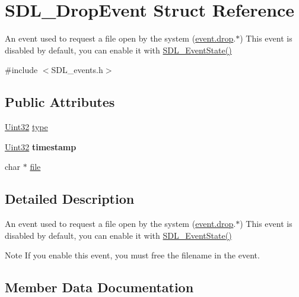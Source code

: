 \hypertarget{structSDL__DropEvent}{}\section{S\+D\+L\+\_\+\+Drop\+Event Struct Reference}
\label{structSDL__DropEvent}


An event used to request a file open by the system (\hyperlink{unionSDL__Event_acff77bccbca65abbb876360a3f5209c9}{event.\+drop}.$\ast$) This event is disabled by default, you can enable it with \hyperlink{SDL__events_8h_afb772893e1c46f186fa39a4defe76df3}{S\+D\+L\+\_\+\+Event\+State()}  




{\ttfamily \#include $<$S\+D\+L\+\_\+events.\+h$>$}

\subsection*{Public Attributes}
\begin{DoxyCompactItemize}
\item 
\hyperlink{SDL__stdinc_8h_add440eff171ea5f55cb00c4a9ab8672d}{Uint32} \hyperlink{structSDL__DropEvent_a5ea27cfaa5f8d4940e9a69b68b3cc035}{type}
\item 
\hypertarget{structSDL__DropEvent_a02d2c81bb22db632a40cd0021ff751ab}{}\hyperlink{SDL__stdinc_8h_add440eff171ea5f55cb00c4a9ab8672d}{Uint32} {\bfseries timestamp}\label{structSDL__DropEvent_a02d2c81bb22db632a40cd0021ff751ab}

\item 
char $\ast$ \hyperlink{structSDL__DropEvent_abc41ef4beb62e1d8b56827128b29585f}{file}
\end{DoxyCompactItemize}


\subsection{Detailed Description}
An event used to request a file open by the system (\hyperlink{unionSDL__Event_acff77bccbca65abbb876360a3f5209c9}{event.\+drop}.$\ast$) This event is disabled by default, you can enable it with \hyperlink{SDL__events_8h_afb772893e1c46f186fa39a4defe76df3}{S\+D\+L\+\_\+\+Event\+State()} 

\begin{DoxyNote}{Note}
If you enable this event, you must free the filename in the event. 
\end{DoxyNote}


\subsection{Member Data Documentation}
\hypertarget{structSDL__DropEvent_abc41ef4beb62e1d8b56827128b29585f}{}
